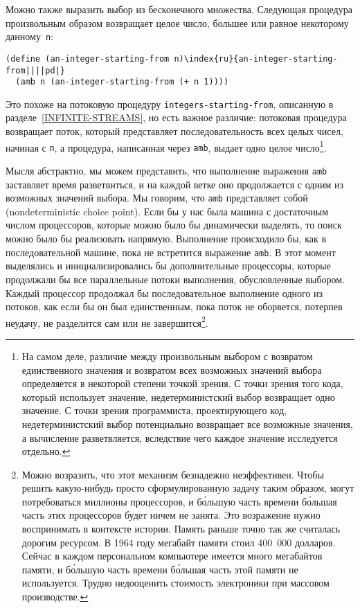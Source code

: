 Можно также выразить выбор из бесконечного множества.
Следующая процедура произвольным образом возвращает целое число,
большее или равное некоторому данному~{\tt n}:

\begin{Verbatim}[fontsize=\small]
(define (an-integer-starting-from n)\index{ru}{an-integer-starting-from||||pd|}
  (amb n (an-integer-starting-from (+ n 1))))
\end{Verbatim}
Это похоже на потоковую процедуру {\tt integers-starting-from},
описанную в разделе~\ref{INFINITE-STREAMS}, но есть важное
различие: потоковая процедура возвращает поток, который представляет
последовательность всех целых чисел, начиная с {\tt n}, а
процедура, написанная через {\tt amb}, выдает одно целое
число\footnote{На самом деле, различие между произвольным выбором с
возвратом единственного значения и возвратом всех возможных значений выбора
определяется в некоторой степени точкой зрения.  С точки зрения того кода, 
который использует значение, недетерминистский выбор возвращает одно
значение.  С точки зрения программиста, проектирующего код,
недетерминистский выбор потенциально возвращает все возможные
значения, а вычисление разветвляется, вследствие чего каждое значение
исследуется отдельно.}.

Мысля абстрактно, мы можем представить, что выполнение выражения
{\tt amb} заставляет  время разветвиться, и на каждой ветке оно
продолжается с одним из возможных значений выбора. Мы говорим, что
{\tt amb} представляет собой 
 (nondeterministic choice point).  Если бы у нас 
была машина с достаточным числом процессоров, которые можно было бы 
динамически выделять, то поиск можно было бы реализовать напрямую.  Выполнение
происходило бы, как в последовательной машине, пока не встретится
выражение {\tt amb}.  В этот момент выделялись и
инициализировались бы дополнительные процессоры, которые продолжали бы
все параллельные потоки выполнения, обусловленные выбором.  Каждый
процессор продолжал бы последовательное выполнение одного из потоков,
как если бы он был
единственным,  пока поток не оборвется, потерпев неудачу, не разделится
сам или не завершится\footnote{Можно возразить, что этот механизм безнадежно
неэффективен.  Чтобы решить какую-нибудь просто сформулированную
задачу таким образом, могут потребоваться миллионы процессоров, и
б\'ольшую часть времени б\'ольшая часть этих процессоров будет ничем не занята.
Это возражение нужно воспринимать в контексте истории.  Память раньше
точно так же считалась дорогим ресурсом.  
В 1964 году мегабайт памяти
стоил 400~000 долларов.  Сейчас в каждом персональном компьютере
имеется много мегабайтов памяти, и б\'ольшую часть времени б\'ольшая часть
этой памяти не используется.  Трудно недооценить стоимость электроники
при массовом производстве.}.

